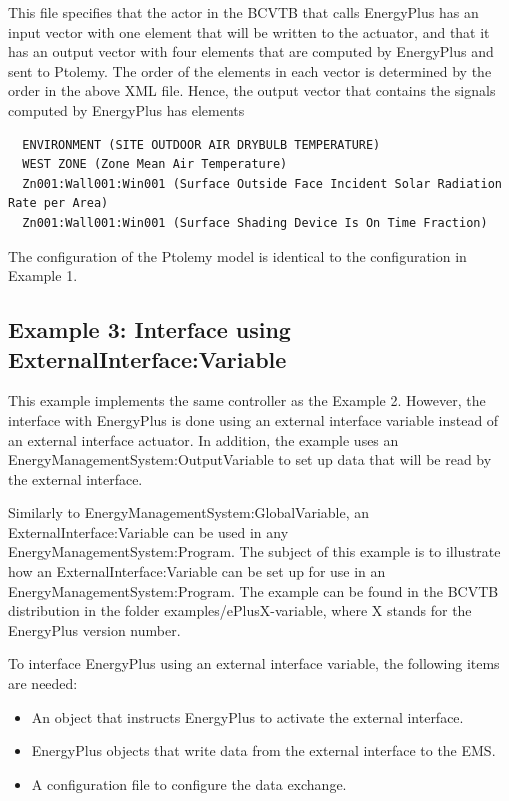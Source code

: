 This file specifies that the actor in the BCVTB that calls EnergyPlus has an input vector with one element that will be written to the actuator, and that it has an output vector with four elements that are computed by EnergyPlus and sent to Ptolemy. The order of the elements in each vector is determined by the order in the above XML file. Hence, the output vector that contains the signals computed by EnergyPlus has elements

\begin{lstlisting}
  ENVIRONMENT (SITE OUTDOOR AIR DRYBULB TEMPERATURE)
  WEST ZONE (Zone Mean Air Temperature)
  Zn001:Wall001:Win001 (Surface Outside Face Incident Solar Radiation Rate per Area)
  Zn001:Wall001:Win001 (Surface Shading Device Is On Time Fraction)
\end{lstlisting}

The configuration of the Ptolemy model is identical to the configuration in Example 1.

\subsection{Example 3: Interface using ExternalInterface:Variable}\label{example-3-interface-using-externalinterfacevariable}

This example implements the same controller as the Example 2. However, the interface with EnergyPlus is done using an external interface variable instead of an external interface actuator. In addition, the example uses an EnergyManagementSystem:OutputVariable to set up data that will be read by the external interface.

Similarly to EnergyManagementSystem:GlobalVariable, an ExternalInterface:Variable can be used in any EnergyManagementSystem:Program. The subject of this example is to illustrate how an ExternalInterface:Variable can be set up for use in an EnergyManagementSystem:Program. The example can be found in the BCVTB distribution in the folder examples/ePlusX-variable, where X stands for the EnergyPlus version number.

To interface EnergyPlus using an external interface variable, the following items are needed:

\begin{itemize}
\item
  An object that instructs EnergyPlus to activate the external interface.
\item
  EnergyPlus objects that write data from the external interface to the EMS.
\item
  A configuration file to configure the data exchange.
\end{itemize}

